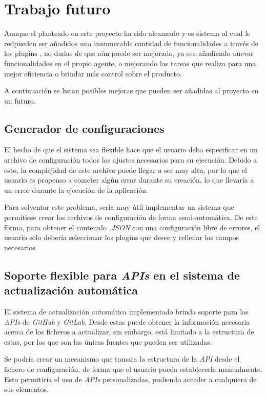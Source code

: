 \section{Trabajo futuro}
        
    Aunque el planteado en este proyecto ha sido alcanzado y es sistema al cual le red{pueden ser añadidos} una innumerable cantidad de funcionalidades a través de los plugins , no  dudas de que aún puede ser mejorado, ya sea añadiendo nuevas funcionalidades en el propio agente, o mejorando las tareas que realiza para  una mejor eficiencia o brindar más control sobre el producto.
    
    A continuación se listan posibles mejoras que pueden ser añadidas al proyecto en un futuro.
            
    \subsection{Generador de configuraciones}
        El hecho de que el sistema sea  flexible hace que el usuario deba especificar en un archivo de configuración todos los ajustes necesarios para su ejecución. Debido a esto, la complejidad de este archivo puede llegar a ser muy alta, por lo que el usuario es propenso a cometer algún error durante su creación, lo que llevaría a un error durante la ejecución de la aplicación.
        
        Para solventar este problema, sería muy útil implementar un sistema que permitiese crear los archivos de configuración de forma semi-automática. De esta forma, para obtener el contenido \textit{.JSON} con una configuración libre de errores, el usuario solo debería seleccionar los plugins que desee y rellenar los campos necesarios.
        
    \subsection{Soporte flexible para \textit{APIs} en el sistema de actualización automática}
        El sistema de actualización automática implementado brinda soporte para las \textit{APIs} de \textit{GitHub} y \textit{GitLab}. Desde estas puede obtener la información necesaria acerca de los ficheros a actualizar, sin embargo, está limitado a la estructura de estas, por los que son las únicas fuentes que pueden ser utilizadas.
        
        Se podría crear un mecanismo que tomara la estructura de la \textit{API} desde el fichero de configuración, de forma que el usuario pueda establecerla manualmente. Esto permitiría el uso de \textit{APIs} personalizadas, pudiendo acceder a cualquiera de sus elementos.

